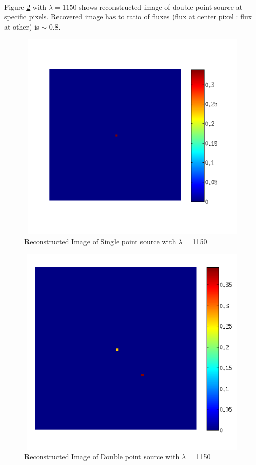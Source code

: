 \paragraph{}Figure \ref{Figdps} with $\lambda=1150$ shows reconstructed image of double point source at specific
pixels. Recovered image has to ratio of fluxes (flux at center pixel : flux at other) is $\sim$ 0.8.

\begin{figure}[!htbp]
  \begin{center}
      \includegraphics[width=5in,height=4in]{figures/sps}
    \caption{Reconstructed Image of Single point source with $\lambda$ = 1150}
    \label{Figsps}
  \end{center}
\end{figure}

\begin{figure}[!htbp]
  \begin{center}
      \includegraphics[width=5in,height=4in]{figures/dps}
    \caption{Reconstructed Image of Double point source with $\lambda$ = 1150}
    \label{Figdps}
  \end{center}
\end{figure}

